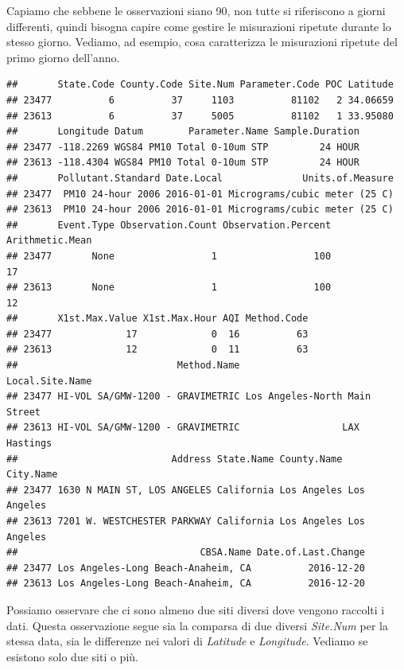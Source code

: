 \documentclass[]{book}
\newenvironment{Shaded}{\begin{snugshade}}{\end{snugshade}}
\newcommand{\NormalTok}[1]{#1}
\newcommand{\OperatorTok}[1]{\textcolor[rgb]{0.81,0.36,0.00}{\textbf{#1}}}
\newcommand{\StringTok}[1]{\textcolor[rgb]{0.31,0.60,0.02}{#1}}
\begin{document}
Capiamo che sebbene le osservazioni siano 90, non tutte si riferiscono a giorni differenti, quindi bisogna capire come gestire le misurazioni ripetute durante lo stesso giorno. Vediamo, ad esempio, cosa caratterizza le misurazioni ripetute del primo giorno dell'anno.

\begin{Shaded}
\end{Shaded}

\begin{verbatim}
##       State.Code County.Code Site.Num Parameter.Code POC Latitude
## 23477          6          37     1103          81102   2 34.06659
## 23613          6          37     5005          81102   1 33.95080
##       Longitude Datum        Parameter.Name Sample.Duration
## 23477 -118.2269 WGS84 PM10 Total 0-10um STP         24 HOUR
## 23613 -118.4304 WGS84 PM10 Total 0-10um STP         24 HOUR
##       Pollutant.Standard Date.Local              Units.of.Measure
## 23477  PM10 24-hour 2006 2016-01-01 Micrograms/cubic meter (25 C)
## 23613  PM10 24-hour 2006 2016-01-01 Micrograms/cubic meter (25 C)
##       Event.Type Observation.Count Observation.Percent Arithmetic.Mean
## 23477       None                 1                 100              17
## 23613       None                 1                 100              12
##       X1st.Max.Value X1st.Max.Hour AQI Method.Code
## 23477             17             0  16          63
## 23613             12             0  11          63
##                            Method.Name               Local.Site.Name
## 23477 HI-VOL SA/GMW-1200 - GRAVIMETRIC Los Angeles-North Main Street
## 23613 HI-VOL SA/GMW-1200 - GRAVIMETRIC                  LAX Hastings
##                           Address State.Name County.Name   City.Name
## 23477 1630 N MAIN ST, LOS ANGELES California Los Angeles Los Angeles
## 23613 7201 W. WESTCHESTER PARKWAY California Los Angeles Los Angeles
##                                CBSA.Name Date.of.Last.Change
## 23477 Los Angeles-Long Beach-Anaheim, CA          2016-12-20
## 23613 Los Angeles-Long Beach-Anaheim, CA          2016-12-20
\end{verbatim}

Possiamo osservare che ci sono almeno due siti diversi dove vengono raccolti i dati. Questa osservazione segue sia la comparsa di due diversi \emph{Site.Num} per la stessa data, sia le differenze nei valori di \emph{Latitude} e \emph{Longitude}. Vediamo se esistono solo due siti o più.
\end{document}
